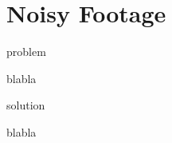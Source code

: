 \chapter{Noisy Footage}
\pagecolor{white}
\label{chap:55}
\begin{fullwidth}

\problem

{\large problem \par}

blabla

\solutions

{\large solution \par}

blabla

\clearpage
\end{fullwidth}